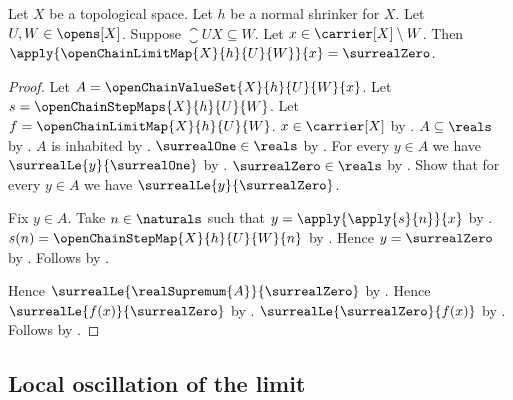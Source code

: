 \begin{proposition}\label{open_chain_limit_map_zero_outside_last}
    Let $X$ be a topological space.
    Let $h$ be a normal shrinker for $X$.
    Let $U,W\in\opens[X]$.
    Suppose $\closure{U}{X}\subseteq W$.
    Let $x\in\carrier[X]\setminus W$.
    Then $\apply{\openChainLimitMap{X}{h}{U}{W}}{x}=\surrealZero$.
\end{proposition}
\begin{proof}
    Let $A=\openChainValueSet{X}{h}{U}{W}{x}$.
    Let $s=\openChainStepMaps{X}{h}{U}{W}$.
    Let $f=\openChainLimitMap{X}{h}{U}{W}$.
    $x\in\carrier[X]$ by .
    $A\subseteq\reals$ by .
    $A$ is inhabited by .
    $\surrealOne\in\reals$ by .
    For every $y\in A$ we have $\surrealLe{y}{\surrealOne}$
        by .
    $\surrealZero\in\reals$ by .
    Show that for every $y\in A$ we have $\surrealLe{y}{\surrealZero}$.
    \begin{subproof}
        Fix $y\in A$.
        Take $n\in\naturals$ such that
            $y=\apply{\apply{s}{n}}{x}$
            by .
        $s(n)=\openChainStepMap{X}{h}{U}{W}{n}$
            by .
        Hence $y=\surrealZero$
            by .
        Follows by .
    \end{subproof}
    Hence $\surrealLe{\realSupremum{A}}{\surrealZero}$
        by .
    Hence $\surrealLe{f(x)}{\surrealZero}$
        by .
    $\surrealLe{\surrealZero}{f(x)}$
        by .
    Follows by
        .
\end{proof}

\subsection{Local oscillation of the limit}

